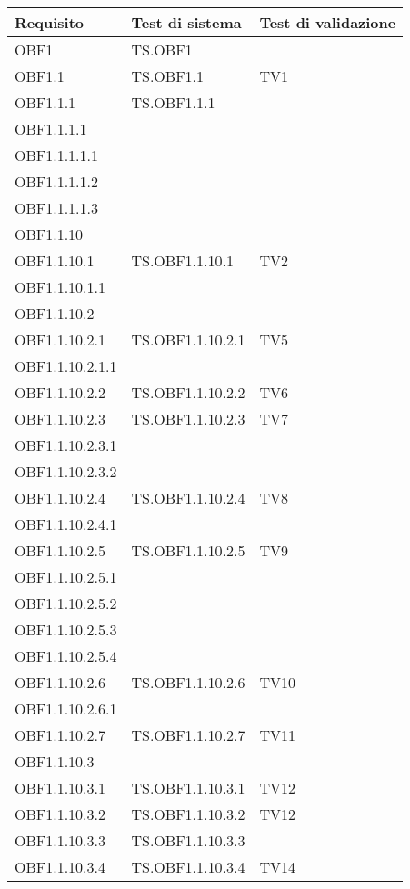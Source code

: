 \documentclass{scalatekids-article}
\begin{document}
\begin{longtable}[H]{|l|p{4cm}|p{4cm}|}
\hline
\textbf{Requisito} & \textbf{Test di sistema} & \textbf{Test di validazione}\\
\hline
OBF1 & TS.OBF1 &  \\
\hline
OBF1.1 & TS.OBF1.1 & TV1 \\
\hline
OBF1.1.1 & TS.OBF1.1.1 & \\
\hline
OBF1.1.1.1 & & \\
\hline
OBF1.1.1.1.1 & & \\
\hline
OBF1.1.1.1.2 & & \\
\hline
OBF1.1.1.1.3 & & \\
\hline
OBF1.1.10 & & \\
\hline
OBF1.1.10.1 & TS.OBF1.1.10.1 & TV2 \\
\hline
OBF1.1.10.1.1 & & \\
\hline
OBF1.1.10.2 &  & \\
\hline
OBF1.1.10.2.1 & TS.OBF1.1.10.2.1 & TV5 \\
\hline
OBF1.1.10.2.1.1 & & \\
\hline
OBF1.1.10.2.2 & TS.OBF1.1.10.2.2 & TV6\\
\hline
OBF1.1.10.2.3 & TS.OBF1.1.10.2.3 & TV7\\
\hline
OBF1.1.10.2.3.1 & & \\
\hline
OBF1.1.10.2.3.2 & & \\
\hline
OBF1.1.10.2.4 & TS.OBF1.1.10.2.4 & TV8\\
\hline
OBF1.1.10.2.4.1 & & \\
\hline
OBF1.1.10.2.5 & TS.OBF1.1.10.2.5 & TV9\\
\hline
OBF1.1.10.2.5.1 & & \\
\hline
OBF1.1.10.2.5.2 & & \\
\hline
OBF1.1.10.2.5.3 & & \\
\hline
OBF1.1.10.2.5.4 & & \\
\hline
OBF1.1.10.2.6 & TS.OBF1.1.10.2.6 & TV10\\
\hline
OBF1.1.10.2.6.1 & & \\
\hline
OBF1.1.10.2.7 & TS.OBF1.1.10.2.7 & TV11\\
\hline
OBF1.1.10.3 & & \\
\hline
OBF1.1.10.3.1 & TS.OBF1.1.10.3.1 & TV12\\
\hline
OBF1.1.10.3.2 & TS.OBF1.1.10.3.2 & TV12\\
\hline
OBF1.1.10.3.3 & TS.OBF1.1.10.3.3 & \\
\hline
OBF1.1.10.3.4 & TS.OBF1.1.10.3.4 & TV14\\

\end{longtable}
\end{document}
